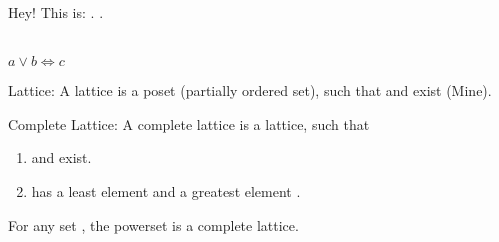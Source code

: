 \documentclass{article}
\begin{document}
Hey! This is: \absexpr{\lor}. \absexpr{\iff}.

\\
\(a \lor b \iff c\)

Lattice: A lattice  is a poset (partially ordered set), such that  and  exist (Mine).

Complete Lattice: A complete lattice  is a lattice, such that
\begin{enumerate}[nosep]
   \item {} and  exist.
   \item {} has a least element \absexpr{\bot} and a greatest element \absexpr{\top}.
\end{enumerate}

For any set , the powerset  is a complete lattice.
\end{document}

